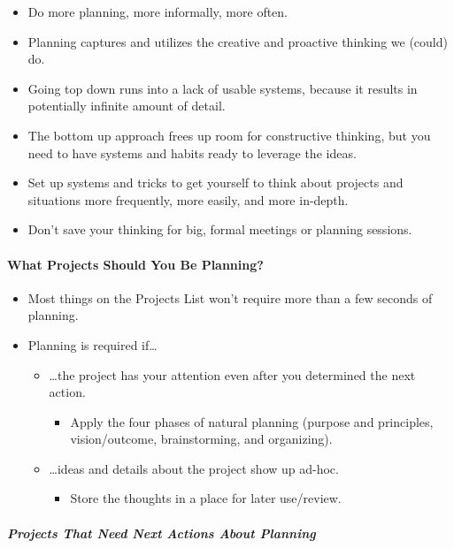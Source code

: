 \documentclass{article}
\begin{document}
\begin{itemize}
 \item Do more planning, more informally, more often.
 \item Planning captures and utilizes the creative and proactive thinking we (could) do.
 \item Going top down runs into a lack of usable systems, because it results in potentially infinite amount of detail.
 \item The bottom up approach frees up room for constructive thinking, but you need to have systems and habits ready to leverage the ideas.
 \item Set up systems and tricks to get yourself to think about projects and situations more frequently, more easily, and more in-depth.
 \item Don't save your thinking for big, formal meetings or planning sessions.
\end{itemize}

\paragraph{What Projects Should You Be Planning?}

\begin{itemize}
 \item Most things on the Projects List won't require more than a few seconds of planning.
 \item Planning is required if\ldots
 \begin{itemize}
  \item \ldots the project has your attention even after you determined the next action.
  \begin{itemize}
   \item Apply the four phases of natural planning (purpose and principles, vision/outcome, brainstorming, and organizing).
  \end{itemize}
  \item \ldots ideas and details about the project show up ad-hoc.
  \begin{itemize}
   \item Store the thoughts in a place for later use/review.
  \end{itemize}
 \end{itemize}
\end{itemize}

\subparagraph{Projects That Need Next Actions About Planning}
\end{document}
